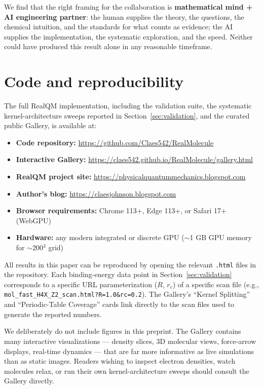 \documentclass[11pt]{article}
\begin{document}
We find that the right framing for the collaboration is \textbf{mathematical mind + AI engineering partner}: the human supplies the theory, the questions, the chemical intuition, and the standards for what counts as evidence; the AI supplies the implementation, the systematic exploration, and the speed. Neither could have produced this result alone in any reasonable timeframe.

\section{Code and reproducibility}\label{sec:code}

The full RealQM implementation, including the validation suite, the systematic kernel-architecture sweeps reported in Section~\ref{sec:validation}, and the curated public Gallery, is available at:

\begin{itemize}
\item \textbf{Code repository:} \url{https://github.com/Claes542/RealMolecule}
\item \textbf{Interactive Gallery:} \url{https://claes542.github.io/RealMolecule/gallery.html}
\item \textbf{RealQM project site:} \url{https://physicalquantummechanics.blogspot.com}
\item \textbf{Author's blog:} \url{https://claesjohnson.blogspot.com}
\item \textbf{Browser requirements:} Chrome 113+, Edge 113+, or Safari 17+ (WebGPU)
\item \textbf{Hardware:} any modern integrated or discrete GPU ($\sim$1 GB GPU memory for $\sim$200$^3$ grid)
\end{itemize}

All results in this paper can be reproduced by opening the relevant \texttt{.html} files in the repository. Each binding-energy data point in Section~\ref{sec:validation} corresponds to a specific URL parameterization ($R$, $r_c$) of a specific scan file (e.g., \texttt{mol\_fast\_H4X\_Z2\_scan.html?R=1.0\&rc=0.2}). The Gallery's ``Kernel Splitting'' and ``Periodic-Table Coverage'' cards link directly to the scan files used to generate the reported numbers.

We deliberately do not include figures in this preprint. The Gallery contains many interactive visualizations --- density slices, 3D molecular views, force-arrow displays, real-time dynamics --- that are far more informative as live simulations than as static images. Readers wishing to inspect electron densities, watch molecules relax, or run their own kernel-architecture sweeps should consult the Gallery directly.
\end{document}
